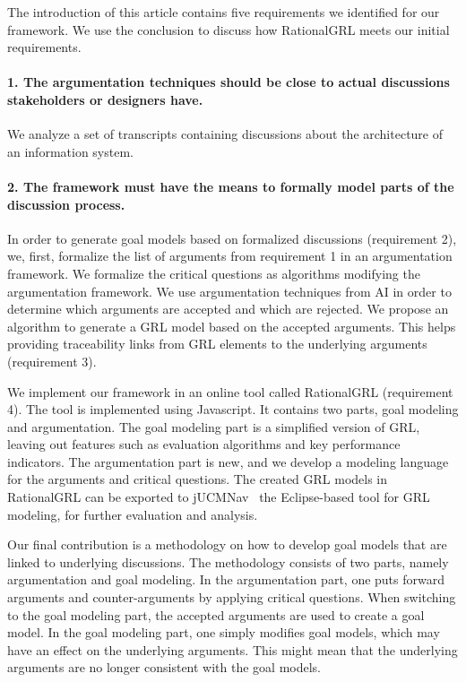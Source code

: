 
The introduction of this article contains five requirements we identified for our framework. We use the conclusion to discuss how RationalGRL meets our initial requirements.

\paragraph{1. The argumentation techniques should be close to actual discussions stakeholders or designers have.}

We analyze a set of transcripts containing discussions about the architecture of an information system. 

\paragraph{2. The framework must have the means to formally model parts of the discussion process.}
In order to generate goal models based on formalized discussions (requirement 2), we, first, formalize the list of arguments from requirement 1 in an argumentation framework. We formalize the critical questions as algorithms modifying the argumentation framework. We use argumentation techniques from AI in order to determine which arguments are accepted and which are rejected. We propose an algorithm to generate a GRL model based on the accepted arguments. This helps providing traceability links from GRL elements to the underlying arguments (requirement 3).

We implement our framework in an online tool called RationalGRL (requirement 4). The tool is implemented using Javascript. It contains  two parts, goal modeling and argumentation. The goal modeling part is a simplified version of GRL, leaving out features such as evaluation algorithms and key performance indicators. The argumentation part is new, and we develop a modeling language for the arguments and critical questions. The created GRL models in RationalGRL can be exported to jUCMNav~\cite{} %
 the Eclipse-based tool for GRL modeling, for further evaluation and analysis. 

Our final contribution is a methodology on how to develop goal models that are linked to underlying discussions. The methodology consists of two parts, namely argumentation and goal modeling. In the argumentation part, one puts forward arguments and counter-arguments by applying critical questions. When switching to the goal modeling part, the accepted arguments are used to create a goal model. In the goal modeling part, one simply modifies goal models, which may have an effect on the underlying arguments. This might mean that the underlying arguments are no longer consistent with the goal models.